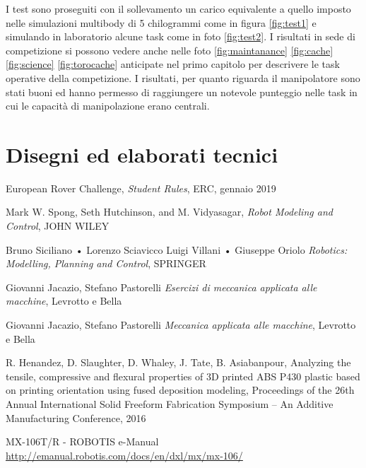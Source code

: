 \documentclass[%
corpo=11pt,
twoside,
 stile=classica,
oldstyle,
greek,%
]{toptesi}
\begin{document}
 	I test sono proseguiti con il sollevamento un carico equivalente a quello imposto nelle simulazioni multibody di 5 chilogrammi come in figura \ref{fig:test1} e simulando in laboratorio alcune task come in foto \ref{fig:test2}. 
 	I risultati in sede di competizione si possono vedere anche nelle foto \ref{fig:maintanance} \ref{fig:cache} \ref{fig:science} \ref{fig:torocache} anticipate nel primo capitolo per descrivere le task operative della competizione. I risultati, per quanto riguarda il manipolatore sono stati buoni ed hanno permesso di raggiungere un notevole punteggio nelle task in cui le capacità di manipolazione erano centrali. 
 		


\backmatter
\chapter{Disegni ed elaborati tecnici}









\begin{thebibliography}{9}
 European Rover Challenge, \emph{Student Rules}, ERC, gennaio 2019

Mark W. Spong, Seth Hutchinson, and M. Vidyasagar, \emph{Robot Modeling and Control}, JOHN WILEY  

Bruno Siciliano • Lorenzo Sciavicco Luigi Villani • Giuseppe Oriolo \emph{Robotics: Modelling, Planning and Control}, SPRINGER

Giovanni Jacazio, Stefano Pastorelli \emph{Esercizi di meccanica applicata alle macchine}, Levrotto e Bella

Giovanni Jacazio, Stefano Pastorelli \emph{Meccanica applicata alle macchine}, Levrotto e Bella

 R. Henandez, D. Slaughter, D. Whaley, J. Tate, B. Asiabanpour, Analyzing the tensile, compressive and flexural properties of 3D printed ABS P430 plastic based on printing orientation using fused deposition modeling, Proceedings of the 26th Annual International Solid Freeform Fabrication Symposium – An Additive Manufacturing Conference, 2016

 MX-106T/R - ROBOTIS e-Manual \url{http://emanual.robotis.com/docs/en/dxl/mx/mx-106/}
\end{thebibliography}
\end{document}
